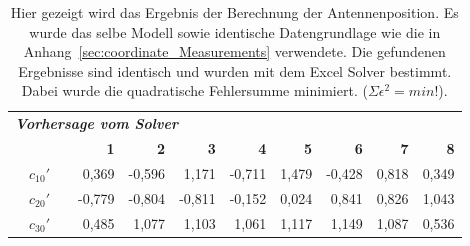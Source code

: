 \begin{table}[h]
  \small \caption{Hier gezeigt wird das Ergebnis der Berechnung der Antennenposition. Es wurde das selbe Modell sowie identische Datengrundlage wie die in Anhang~\ref{sec:coordinate_Measurements} verwendete. Die gefundenen Ergebnisse sind identisch und wurden mit dem Excel Solver bestimmt. Dabei wurde die quadratische Fehlersumme minimiert. ($\Sigma\epsilon^2 = min!$).}
    \vspace{0.5cm}
    \begin{tabular}{r|rrr|r|r|r|r|rrr}


    \multicolumn{11}{l}{\textit{\textbf{Vorhersage vom Solver}}} \\
    \multicolumn{1}{r}{} &       &       & \multicolumn{1}{r}{\textbf{1}} & \multicolumn{1}{r}{\textbf{2}} & \multicolumn{1}{r}{\textbf{3}} & \multicolumn{1}{r}{\textbf{4}} & \multicolumn{1}{r}{\textbf{5}} & \textbf{6} & \textbf{7} & \textbf{8} \\
\cline{2-11}    \multicolumn{1}{r}{} & $c_{10}'$ &       & \multicolumn{1}{r}{0,369} & \multicolumn{1}{r}{-0,596} & \multicolumn{1}{r}{1,171} & \multicolumn{1}{r}{-0,711} & \multicolumn{1}{r}{1,479} & -0,428 & 0,818 & 0,349 \\
    \multicolumn{1}{r}{} & $c_{20}'$ &       & \multicolumn{1}{r}{-0,779} & \multicolumn{1}{r}{-0,804} & \multicolumn{1}{r}{-0,811} & \multicolumn{1}{r}{-0,152} & \multicolumn{1}{r}{0,024} & 0,841 & 0,826 & 1,043 \\
    \multicolumn{1}{r}{} & {$c_{30}'$} &       & \multicolumn{1}{r}{0,485} & \multicolumn{1}{r}{1,077} & \multicolumn{1}{r}{1,103} & \multicolumn{1}{r}{1,061} & \multicolumn{1}{r}{1,117} & 1,149 & 1,087 & 0,536 \\

\end{tabular}
\end{table}
